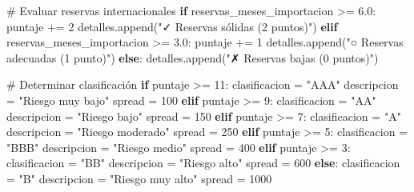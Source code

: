 \documentclass[
  doc,
  floatsintext,
  longtable,
  a4paper,
  nolmodern,
  notxfonts,
  notimes,
  12pt,
  colorlinks=true,linkcolor=blue,citecolor=blue,urlcolor=blue]{apa7}
\newenvironment{Shaded}{\begin{snugshade}}{\end{snugshade}}
\newcommand{\CommentTok}[1]{\textcolor[rgb]{0.37,0.37,0.37}{#1}}
\newcommand{\ControlFlowTok}[1]{\textcolor[rgb]{0.00,0.23,0.31}{\textbf{#1}}}
\newcommand{\DecValTok}[1]{\textcolor[rgb]{0.68,0.00,0.00}{#1}}
\newcommand{\FloatTok}[1]{\textcolor[rgb]{0.68,0.00,0.00}{#1}}
\newcommand{\NormalTok}[1]{\textcolor[rgb]{0.00,0.23,0.31}{#1}}
\newcommand{\OperatorTok}[1]{\textcolor[rgb]{0.37,0.37,0.37}{#1}}
\newcommand{\StringTok}[1]{\textcolor[rgb]{0.13,0.47,0.30}{#1}}
\begin{document}
\begin{Shaded}
\begin{Highlighting}[]
        \CommentTok{\# Evaluar reservas internacionales}
        \ControlFlowTok{if}\NormalTok{ reservas\_meses\_importacion }\OperatorTok{\textgreater{}=} \FloatTok{6.0}\NormalTok{:}
\NormalTok{            puntaje }\OperatorTok{+=} \DecValTok{2}
\NormalTok{            detalles.append(}\StringTok{"✓ Reservas sólidas (2 puntos)"}\NormalTok{)}
        \ControlFlowTok{elif}\NormalTok{ reservas\_meses\_importacion }\OperatorTok{\textgreater{}=} \FloatTok{3.0}\NormalTok{:}
\NormalTok{            puntaje }\OperatorTok{+=} \DecValTok{1}
\NormalTok{            detalles.append(}\StringTok{"○ Reservas adecuadas (1 punto)"}\NormalTok{)}
        \ControlFlowTok{else}\NormalTok{:}
\NormalTok{            detalles.append(}\StringTok{"✗ Reservas bajas (0 puntos)"}\NormalTok{)}
        
        \CommentTok{\# Determinar clasificación}
        \ControlFlowTok{if}\NormalTok{ puntaje }\OperatorTok{\textgreater{}=} \DecValTok{11}\NormalTok{:}
\NormalTok{            clasificacion }\OperatorTok{=} \StringTok{"AAA"}
\NormalTok{            descripcion }\OperatorTok{=} \StringTok{"Riesgo muy bajo"}
\NormalTok{            spread }\OperatorTok{=} \DecValTok{100}
        \ControlFlowTok{elif}\NormalTok{ puntaje }\OperatorTok{\textgreater{}=} \DecValTok{9}\NormalTok{:}
\NormalTok{            clasificacion }\OperatorTok{=} \StringTok{"AA"}
\NormalTok{            descripcion }\OperatorTok{=} \StringTok{"Riesgo bajo"}
\NormalTok{            spread }\OperatorTok{=} \DecValTok{150}
        \ControlFlowTok{elif}\NormalTok{ puntaje }\OperatorTok{\textgreater{}=} \DecValTok{7}\NormalTok{:}
\NormalTok{            clasificacion }\OperatorTok{=} \StringTok{"A"}
\NormalTok{            descripcion }\OperatorTok{=} \StringTok{"Riesgo moderado"}
\NormalTok{            spread }\OperatorTok{=} \DecValTok{250}
        \ControlFlowTok{elif}\NormalTok{ puntaje }\OperatorTok{\textgreater{}=} \DecValTok{5}\NormalTok{:}
\NormalTok{            clasificacion }\OperatorTok{=} \StringTok{"BBB"}
\NormalTok{            descripcion }\OperatorTok{=} \StringTok{"Riesgo medio"}
\NormalTok{            spread }\OperatorTok{=} \DecValTok{400}
        \ControlFlowTok{elif}\NormalTok{ puntaje }\OperatorTok{\textgreater{}=} \DecValTok{3}\NormalTok{:}
\NormalTok{            clasificacion }\OperatorTok{=} \StringTok{"BB"}
\NormalTok{            descripcion }\OperatorTok{=} \StringTok{"Riesgo alto"}
\NormalTok{            spread }\OperatorTok{=} \DecValTok{600}
        \ControlFlowTok{else}\NormalTok{:}
\NormalTok{            clasificacion }\OperatorTok{=} \StringTok{"B"}
\NormalTok{            descripcion }\OperatorTok{=} \StringTok{"Riesgo muy alto"}
\NormalTok{            spread }\OperatorTok{=} \DecValTok{1000}
        

\end{Highlighting}
\end{Shaded}
\end{document}
